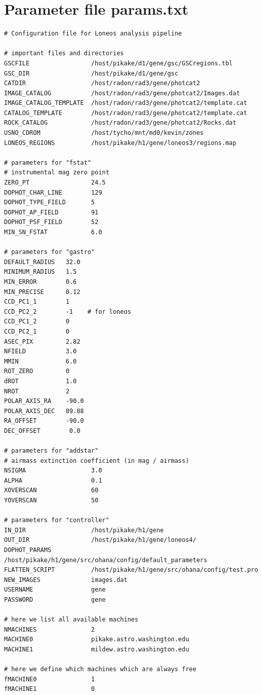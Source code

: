 \documentclass{article}
\begin{document}
\section{Parameter file params.txt}
{\footnotesize
\begin{verbatim}
# Configuration file for Loneos analysis pipeline

# important files and directories
GSCFILE                 /host/pikake/d1/gene/gsc/GSCregions.tbl
GSC_DIR                 /host/pikake/d1/gene/gsc
CATDIR                  /host/radon/rad3/gene/photcat2
IMAGE_CATALOG           /host/radon/rad3/gene/photcat2/Images.dat
IMAGE_CATALOG_TEMPLATE  /host/radon/rad3/gene/photcat2/template.cat
CATALOG_TEMPLATE        /host/radon/rad3/gene/photcat2/template.cat
ROCK_CATALOG            /host/radon/rad3/gene/photcat2/Rocks.dat
USNO_CDROM              /host/tycho/mnt/md0/kevin/zones
LONEOS_REGIONS          /host/pikake/h1/gene/loneos3/regions.map

# parameters for "fstat"
# instrumental mag zero point
ZERO_PT                 24.5
DOPHOT_CHAR_LINE        129
DOPHOT_TYPE_FIELD       5
DOPHOT_AP_FIELD         91
DOPHOT_PSF_FIELD        52
MIN_SN_FSTAT            6.0

# parameters for "gastro"
DEFAULT_RADIUS   32.0
MINIMUM_RADIUS   1.5
MIN_ERROR        0.6
MIN_PRECISE      0.12
CCD_PC1_1        1
CCD_PC2_2        -1    # for loneos
CCD_PC1_2        0
CCD_PC2_1        0
ASEC_PIX         2.82
NFIELD           3.0
MMIN             6.0
ROT_ZERO         0
dROT             1.0
NROT             2
POLAR_AXIS_RA    -90.0
POLAR_AXIS_DEC   89.88
RA_OFFSET        -90.0
DEC_OFFSET        0.0

# parameters for "addstar"
# airmass extinction coefficient (in mag / airmass)
NSIGMA                  3.0
ALPHA                   0.1
XOVERSCAN               60
YOVERSCAN               50

# parameters for "controller"
IN_DIR                  /host/pikake/h1/gene
OUT_DIR                 /host/pikake/h1/gene/loneos4/
DOPHOT_PARAMS           /host/pikake/h1/gene/src/ohana/config/default_parameters
FLATTEN_SCRIPT          /host/pikake/h1/gene/src/ohana/config/test.pro
NEW_IMAGES              images.dat
USERNAME                gene
PASSWORD                gene

# here we list all available machines
NMACHINES               2
MACHINE0                pikake.astro.washington.edu
MACHINE1                mildew.astro.washington.edu

# here we define which machines which are always free
fMACHINE0               1
fMACHINE1               0


\end{verbatim}}
\end{document}

